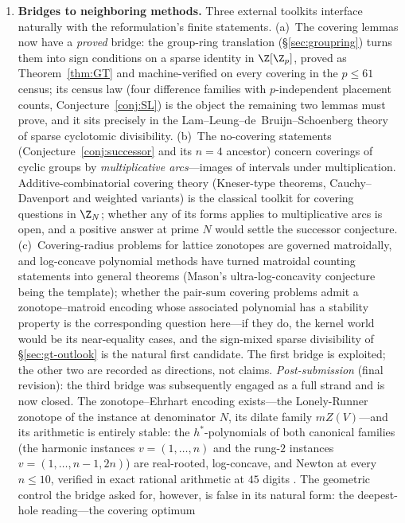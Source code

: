 \begin{enumerate}[leftmargin=1.7em,itemsep=4pt]
\item \textbf{Bridges to neighboring methods.} Three external toolkits
  interface naturally with the reformulation's finite statements.
  (a)~The covering lemmas now have a \emph{proved} bridge: the group-ring
  translation (\S\ref{sec:groupring}) turns them into sign conditions on
  a sparse identity in $\Z[\Z_p]$, proved as Theorem~\ref{thm:GT} and
  machine-verified on every covering in the $p\le61$ census; its census
  law (four difference families with $p$-independent placement counts,
  Conjecture~\ref{conj:SL}) is the object the remaining two lemmas must
  prove, and it sits precisely in the Lam--Leung--de~Bruijn--Schoenberg
  theory of sparse cyclotomic divisibility.
  (b)~The no-covering
  statements (Conjecture~\ref{conj:successor} and its $n=4$ ancestor)
  concern coverings of cyclic groups by \emph{multiplicative
  arcs}---images of intervals under multiplication. Additive-combinatorial
  covering theory (Kneser-type theorems, Cauchy--Davenport and weighted
  variants) is the classical toolkit for covering questions in $\Z_N$;
  whether any of its forms applies to multiplicative arcs is open, and a
  positive answer at prime $N$ would settle the successor conjecture.
  (c)~Covering-radius problems for lattice zonotopes are governed
  matroidally, and log-concave polynomial methods have turned matroidal
  counting statements into general theorems (Mason's ultra-log-concavity
  conjecture being the template); whether the pair-sum covering problems
  admit a zonotope--matroid encoding whose associated polynomial has a
  stability property is the corresponding question here---if they do, the
  kernel world would be its near-equality cases, and the sign-mixed
  sparse divisibility of \S\ref{sec:gt-outlook} is the natural first
  candidate. The first bridge is exploited; the other two are recorded as
  directions, not claims. \emph{Post-submission} (final revision): the
  third bridge was subsequently engaged as a full strand and is now
  closed. The zonotope--Ehrhart encoding exists---the Lonely-Runner
  zonotope of the instance at denominator $N$, its dilate family
  $mZ(V)$---and its arithmetic is entirely stable: the $h^*$-polynomials
  of both canonical families (the harmonic instances $v=(1,\dots,n)$ and
  the rung-$2$ instances $v=(1,\dots,n{-}1,2n)$) are real-rooted,
  log-concave, and Newton at every $n\le 10$, verified in exact
  rational arithmetic at $45$ digits \cite{companion-paper}. The
  geometric control the bridge asked for, however, is false in its
  natural form: the deepest-hole reading---the covering optimum

\end{enumerate}
